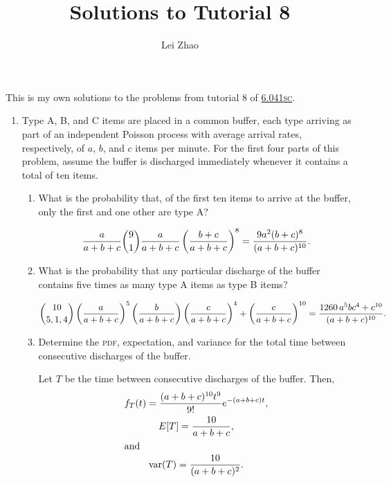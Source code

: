 

\title{Solutions to Tutorial 8}
\author{Lei Zhao}


\maketitle

This is my own solutions to the problems from tutorial 8 of
\href{https://ocw.mit.edu/courses/electrical-engineering-and-computer-science/6-041sc-probabilistic-systems-analysis-and-applied-probability-fall-2013/unit-iii/lecture-15/}{6.041\textsc{sc}}.

\begin{enumerate}
\item Type A, B, and C items are placed in a common
  buffer, each type arriving as part of an inde­pendent Poisson
  process with average arrival rates, respectively, of \(a\), \(b\),
  and \(c\) items per minute.  For the first four parts of this
  problem, assume the buffer is discharged immediately whenever it
  contains a total of ten items.
  \begin{enumerate}
  \item What is the probability that, of the first ten items to arrive
    at the buffer, only the first and one other are type A?

    \[\frac{a}{a+b+c} \binom91 \frac{a}{a+b+c} \left( \frac{b+c}{a+b+c} \right)^8 = \frac{9 a^2 (b+c)^8}{(a+b+c)^{10}}.\]

  \item What is the probability that any particular discharge of the
    buffer contains five times as many type A items as type B items?

    \[\binom{10}{5, 1, 4}\left( \frac{a}{a+b+c} \right)^5 \left( \frac{b}{a+b+c} \right) \left( \frac{c}{a+b+c} \right)^4 + \left( \frac{c}{a+b+c} \right)^{10} = \frac{1260 \, a^5 b c^4 + c^{10}}{(a+b+c)^{10}}.\]

  \item Determine the \textsc{pdf}, expectation, and variance for the total
    time between consecutive discharges of the buffer.

    Let \(T\) be the time between consecutive discharges of the buffer.  Then,
    \begin{gather*}
      f_T(t) = \frac{(a+b+c)^{10} t^9}{9!} e^{-(a+b+c)t}, \\
      E[T] = \frac{10}{a+b+c}, \\
      \intertext{and}
      \operatorname{var}(T) = \frac{10}{(a+b+c)^2}.
    \end{gather*}


\end{enumerate}
\end{enumerate}
